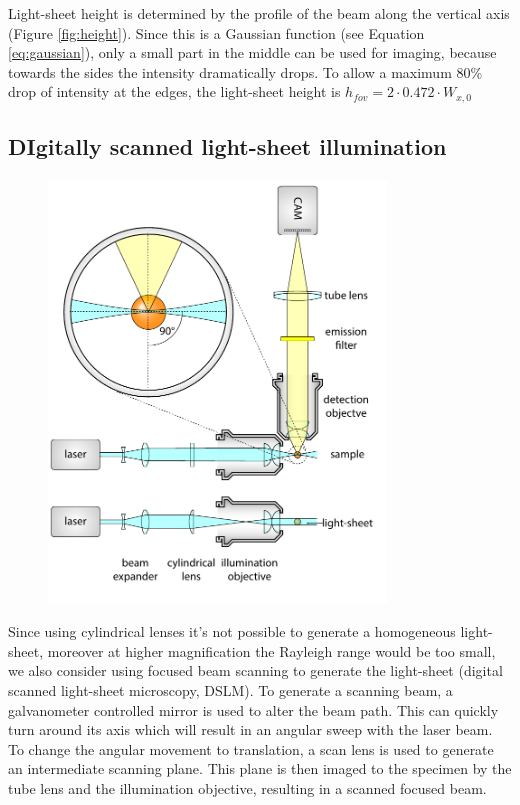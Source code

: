       Light-sheet height is determined by the profile of the beam along the vertical axis (Figure \ref{fig:height}). Since this is a Gaussian function (see Equation \ref{eq:gaussian}), only a small part in the middle can be used for imaging, because towards the sides the intensity dramatically drops. To allow a maximum 80\% drop of intensity at the edges, the light-sheet height is $h_{fov}=2\cdot 0.472\cdot W_{x,0}$
      

    \subsection{DIgitally scanned light-sheet illumination}
      \begin{figure}[bt!]
        \centering
        \includegraphics[page=2,width=0.8\textwidth]{spim_cyl}
          \label{fig:dslm}
      \end{figure}

      Since using cylindrical lenses it's not possible to generate a homogeneous light-sheet, moreover at higher magnification the Rayleigh range would be too small, we also consider using focused beam scanning to generate the light-sheet (digital scanned light-sheet microscopy, DSLM). To generate a scanning beam, a galvanometer controlled mirror is used to alter the beam path. This can quickly turn around its axis which will result in an angular sweep with the laser beam. To change the angular movement to translation, a scan lens is used to generate an intermediate scanning plane. This plane is then imaged to the specimen by the tube lens and the illumination objective, resulting in a scanned focused beam.

